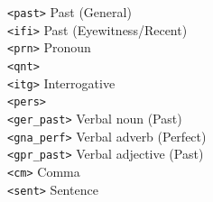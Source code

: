 \documentclass[a0paper,fontscale=0.3]{baposter}  %
\begin{document}
\begin{poster}
{\begin{multicols}{3}
\begin{tabbing}
  \texttt{{\small <past>}} \> Past (General) \\[-0.5ex]
  \texttt{{\small <ifi>}} \> Past (Eyewitness/Recent) \\[-0.5ex]
  \texttt{{\small <prn>}} \> Pronoun \\[-0.5ex]
  \texttt{{\small <qnt>}} \> \\[-0.5ex]
  \texttt{{\small <itg>}} \> Interrogative \\[-0.5ex]
  \texttt{{\small <pers>}} \> \\[-0.5ex]
  \texttt{{\small <ger\_past>}} \> Verbal noun (Past)\\[-0.5ex]
  \texttt{{\small <gna\_perf>}} \> Verbal adverb (Perfect)\\[-0.5ex]
  \texttt{{\small <gpr\_past>}} \> Verbal adjective (Past)\\[-0.5ex]
  \texttt{{\small <cm>}} \> Comma\\[-0.5ex]
  \texttt{{\small <sent>}} \> Sentence\\
  
\end{tabbing}
\end{multicols}

		}


\end{poster}
\end{document}
